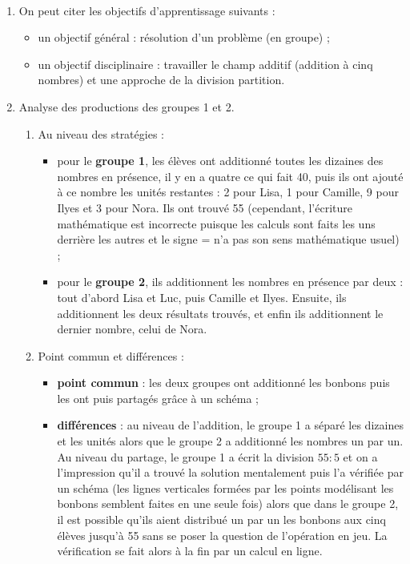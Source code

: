\ \\ [-5mm]
\begin{enumerate}
   \item On peut citer les objectifs d'apprentissage suivants :
   \begin{itemize}
      \item un objectif général : résolution d'un problème (en groupe) ;
      \item un objectif disciplinaire : travailler le champ additif (addition à cinq nombres) et une approche de la division partition.
   \end{itemize}
   \item Analyse des productions des groupes 1 et 2. \\
   \begin{enumerate}
      \item Au niveau des stratégies :
      \begin{itemize}
         \item pour le {\bf groupe 1}, les élèves ont additionné toutes les dizaines des nombres en présence, il y en a quatre ce qui fait 40, puis ils ont ajouté à ce nombre les unités restantes : 2 pour Lisa, 1 pour Camille, 9 pour Ilyes et 3 pour Nora. Ils ont trouvé 55 (cependant, l'écriture mathématique est incorrecte puisque les calculs sont faits les uns derrière les autres et le signe \og = \fg{} n'a pas son sens mathématique usuel) ;
         \item pour le {\bf groupe 2}, ils additionnent les nombres en présence par deux : tout d'abord Lisa et Luc, puis Camille et Ilyes. Ensuite, ils additionnent les deux résultats trouvés, et enfin ils additionnent le dernier nombre, celui de Nora.
      \end{itemize}
      \item Point commun et différences :
      \begin{itemize}
         \item {\bf point commun} : les deux groupes ont additionné les bonbons puis les ont puis \og partagés \fg{} grâce à un schéma ;
         \item {\bf différences} : au niveau de l'addition, le groupe 1 a séparé les dizaines et les unités alors que le groupe 2 a additionné les nombres un par un. \\
         Au niveau du partage, le groupe 1 a écrit la division $55:5$ et on a l'impression qu'il a trouvé la solution mentalement puis l'a vérifiée par un schéma (les lignes verticales formées par les points modélisant les bonbons semblent faites en une seule fois) alors que dans le groupe 2, il est possible qu'ils aient distribué un par un les bonbons aux cinq élèves jusqu'à 55 sans se poser la question de l'opération en jeu. La vérification se fait alors à la fin par un calcul en ligne.

\end{itemize}
\end{enumerate}
\end{enumerate}
